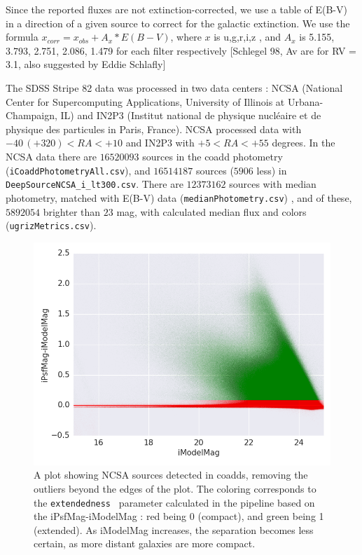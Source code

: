 \documentclass[fleqn,usenatbib]{mnras}  %
\begin{document}
Since the reported fluxes are not extinction-corrected, we use a table of E(B-V) in a direction of a given source to correct for the galactic extinction. We use the formula  $x_{corr}  = x_{obs} + A_{x} * E(B-V)$, where $x$ is  u,g,r,i,z , and $A_x$ is 5.155, 3.793, 2.751, 2.086, 1.479  for each filter respectively  [Schlegel 98, Av are for RV = 3.1, also suggested by Eddie Schlafly] 

The SDSS Stripe 82 data was processed in two data centers : NCSA (National Center for Supercomputing Applications, University of Illinois at Urbana-Champaign, IL) and IN2P3  (Institut national de physique nucl\'eaire et de physique des particules in Paris, France). NCSA processed data  with  $-40 \, (+320) < RA < +10 $ and IN2P3 with $ +5 < RA < +55$ degrees. In the NCSA data  there are $16520093$ sources in the coadd photometry (\verb|iCoaddPhotometryAll.csv|), and $16514187$ sources ($5906$ less) in \verb|DeepSourceNCSA_i_lt300.csv|. There are $12373162$ sources with median photometry, matched with E(B-V) data (\verb|medianPhotometry.csv|) , and  of these, $5892054$ brighter than $23$ mag, with calculated median flux and colors (\verb|ugrizMetrics.csv|). 


\begin{figure}
\label{fig:coadds_ext}
 \includegraphics[width=\columnwidth]{Extendedness_coadd_data_16520093_srcs_lim.png}
 \cprotect\caption{A plot showing NCSA sources detected in coadds, removing the outliers beyond the edges of the plot. The coloring corresponds to the \verb|extendedness | parameter calculated in the pipeline based on the iPsfMag-iModelMag : red being 0 (compact), and green being 1 (extended). As iModelMag increases, the separation becomes less certain, as more distant galaxies are more compact.  }
\end{figure}
% 
\end{document}
